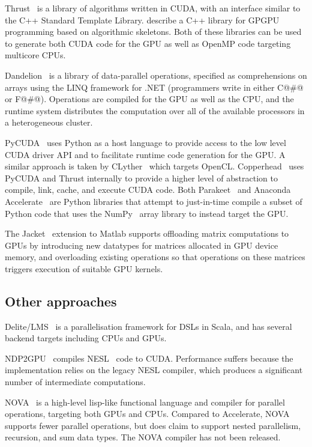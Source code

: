 Thrust~\cite{ThrustAParallelT:ub} is a library of algorithms written in CUDA,
with an interface similar to the C++ Standard Template Library.
\citet{Sato:2009cq} describe a C++ library for GPGPU programming based on
algorithmic skeletons. Both of these libraries can be used to generate both CUDA
code for the GPU as well as OpenMP code targeting multicore CPUs.



Dandelion~\cite{Rossbach:2013bj} is a library of data-parallel operations,
specified as comprehensions on arrays using the LINQ framework for .NET
(programmers write in either C@#@ or F@#@). Operations are compiled for the GPU
as well as the CPU, and the runtime system distributes the computation over all
of the available processors in a heterogeneous cluster.


PyCUDA~\cite{Klockner:2012tj} uses Python as a host language to provide access
to the low level CUDA driver API and to facilitate runtime code generation for
the GPU. A similar approach is taken by CLyther~\cite{CLyther:EvXSiruK} which
targets OpenCL. Copperhead~\cite{Catanzaro:2011cn} uses PyCUDA and Thrust
internally to provide a higher level of abstraction to compile, link, cache, and
execute CUDA code. Both Parakeet~\cite{Rubinsteyn:2012ve} and Anaconda
Accelerate~\cite{AnacondaAccelerate:2013vn} are Python libraries that attempt to
just-in-time compile a subset of Python code that uses the
NumPy~\cite{NumPy:2006uq} array library to instead target the GPU.

The Jacket~\cite{AccelerEyes:vq} extension to Matlab supports offloading matrix
computations to GPUs by introducing new datatypes for matrices allocated in GPU
device memory, and overloading existing operations so that operations on these
matrices triggers execution of suitable GPU kernels.


\subsection{Other approaches}

Delite/LMS~\cite{Rompf:2013er} is a parallelisation framework for DSLs in Scala,
and has several backend targets including CPUs and GPUs.

NDP2GPU~\cite{Bergstrom:2012bi} compiles NESL~\cite{Blelloch:1995ut} code to
CUDA. Performance suffers because the implementation relies on the legacy NESL
compiler, which produces a significant number of intermediate computations.

NOVA~\cite{Collins:2013wn} is a high-level lisp-like functional language and
compiler for parallel operations, targeting both GPUs and CPUs. Compared to
Accelerate, NOVA supports fewer parallel operations, but does claim to support
nested parallelism, recursion, and sum data types. The NOVA compiler has not
been released.


